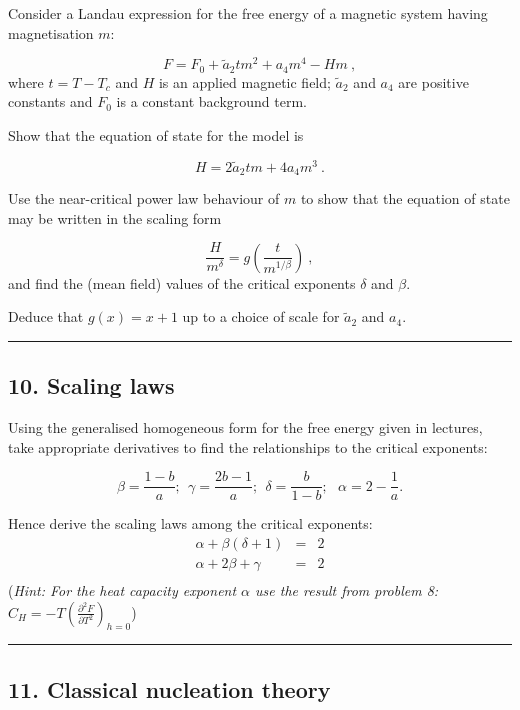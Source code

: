 \documentclass[
  letterpaper,
  enabledeprecatedfontcommands]{report}
\begin{document}
Consider a Landau expression for the free energy of a magnetic system
having magnetisation \(m\):

\[
F=F_0+\tilde{a}_2tm^2+a_4m^4-Hm\:,
\] where \(t=T-T_c\) and \(H\) is an applied magnetic field;
\(\tilde{a}_2\) and \(a_4\) are positive constants and \(F_0\) is a
constant background term.

Show that the equation of state for the model is

\[
H=2\tilde{a}_2tm+4a_4m^3\:.
\]

Use the near-critical power law behaviour of \(m\) to show that the
equation of state may be written in the scaling form

\[
\frac{H}{m^\delta}=g\left(\frac{t}{m^{1/\beta}}\right)\:,
\] and find the (mean field) values of the critical exponents \(\delta\)
and \(\beta\).

Deduce that \(g(x)=x+1\) up to a choice of scale for \(\tilde{a}_2\) and
\(a_4\).

\begin{center}\rule{0.5\linewidth}{0.5pt}\end{center}

\subsection*{10. Scaling laws}\label{scaling-laws}

Using the generalised homogeneous form for the free energy given in
lectures, take appropriate derivatives to find the relationships to the
critical exponents:

\[
\beta=\frac{1-b}{a}; ~~ \gamma=\frac{2b-1}{a};~~ \delta= \frac{b}{1-b}; ~~~ \alpha=2-\frac{1}{a}.
\]

Hence derive the scaling laws among the critical exponents: \[
\begin{eqnarray*}
\alpha+\beta(\delta+1)&=& 2 \\
\alpha+2\beta+\gamma &=& 2\\
\end{eqnarray*}\] (\emph{Hint: For the heat capacity exponent \(\alpha\)
use the result from problem 8:
\(C_H=-T\left(\frac{\partial^2F}{\partial T^2}\right)_{h=0}\)})

\begin{center}\rule{0.5\linewidth}{0.5pt}\end{center}

\subsection*{11. Classical nucleation
theory}\label{classical-nucleation-theory}
\end{document}
